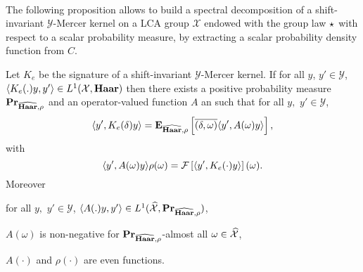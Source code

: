 \paragraph{}
The following proposition allows to build a spectral decomposition of a shift-invariant $\mathcal{Y}$-Mercer kernel on a \acs{LCA} group $\mathcal{X}$ endowed with the group law $\star$ with respect to a scalar probability measure, by extracting a scalar probability density function from $C$.
\begin{proposition}
\label{pr:spectral}
Let $K_e$ be the signature of a shift-invariant $\mathcal{Y}$-Mercer kernel. If for all $y$, $y' \in\mathcal{Y}$, $\langle K_e(.)y,y'\rangle\in L^1(\mathcal{X},\mathbf{Haar})$ then there exists a positive probability measure ${\mathbf{{Pr}}}_{\widehat{\mathbf{Haar}},\rho}$ and an operator-valued function $A$ an such that for all $y,$ $y'\in\mathcal{Y}$,
\begin{dmath}
\label{eq:expectation_spec}
\inner{y', K_e(\delta)y}
=\expectation_{\dual{\Haar},\rho}\left[\conj{\pairing{\delta, \omega}}\inner{y', A(\omega)y}\right],
\end{dmath}
with
\begin{dmath}
\label{eq:comega}
\inner{y', A(\omega)y}\rho(\omega) = \FT{\inner{y', K_e(\cdot)y}}(\omega).
\end{dmath}
Moreover
\begin{propenum}
\item for all $y,$ $y'\in\mathcal{Y}$, $\langle A(.)y,y'\rangle\in L^1(\widehat{\mathcal{X}}, {\mathbf{{Pr}}}_{\widehat{\mathbf{Haar}},\rho})$,
\item $A(\omega)$ is non-negative for ${\mathbf{{Pr}}}_{\widehat{\mathbf{Haar}},\rho}$-almost all $\omega\in\widehat{\mathcal{X}}$,
\item $A(\cdot)$ and $\rho(\cdot)$ are even functions.
\end{propenum}
\end{proposition}
